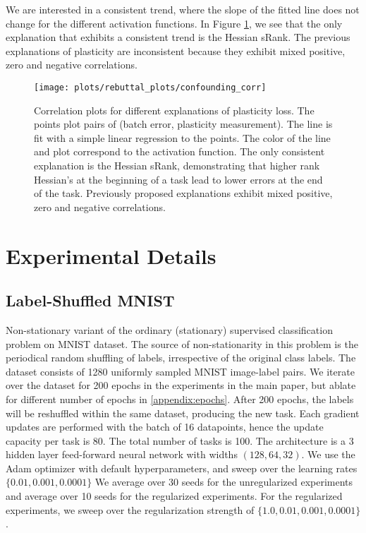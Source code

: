   We are interested in a consistent trend, where the slope of the fitted line does not change for the different activation functions. In Figure \ref{fig:shuffle_reg_corr}, we see that the only explanation that exhibits a consistent trend is the Hessian sRank. The previous explanations of plasticity are inconsistent because they exhibit mixed positive, zero and negative correlations.


\begin{figure}[h!]
  \centering
  \texttt{[image: plots/rebuttal\_plots/confounding\_corr]}
  \caption{
      Correlation plots for different explanations of plasticity loss. The points plot pairs of (batch error, plasticity measurement). The line is fit with a simple linear regression to the points. The color of the line and plot correspond to the activation function. The only consistent explanation is the Hessian sRank, demonstrating that higher rank Hessian's at the beginning of a task lead to lower errors at the end of the task. Previously proposed explanations exhibit mixed positive, zero and negative correlations.
    }
  \label{fig:shuffle_reg_corr}
\end{figure}



\clearpage
\section{Experimental Details}

\subsection{Label-Shuffled MNIST}
\label{appendix:exp_details_label_mnist}
Non-stationary variant of the ordinary (stationary) supervised classification problem on MNIST dataset.
The source of non-stationarity in this problem is the periodical random shuffling of labels, irrespective of the original class labels.
The dataset consists of 1280 uniformly sampled MNIST image-label pairs.
We iterate over the dataset for 200 epochs in the experiments in the main paper, but ablate for different number of epochs in \ref{appendix:epochs}.
After 200 epochs,  the labels will be reshuffled within the same dataset, producing the new task.
Each gradient updates are performed with the batch of 16 datapoints, hence the update capacity per task is 80.
The total number of tasks is 100.
The architecture is a 3 hidden layer feed-forward neural network with widths $(128, 64, 32)$.
We use the Adam optimizer with default hyperparameters, and sweep over the learning rates $\{0.01, 0.001, 0.0001\}$
We average over 30 seeds for the unregularized experiments and average over 10 seeds for the regularized experiments.
For the regularized experiments, we sweep over the regularization strength of $\{1.0, 0.01, 0.001, 0.0001\}$.



